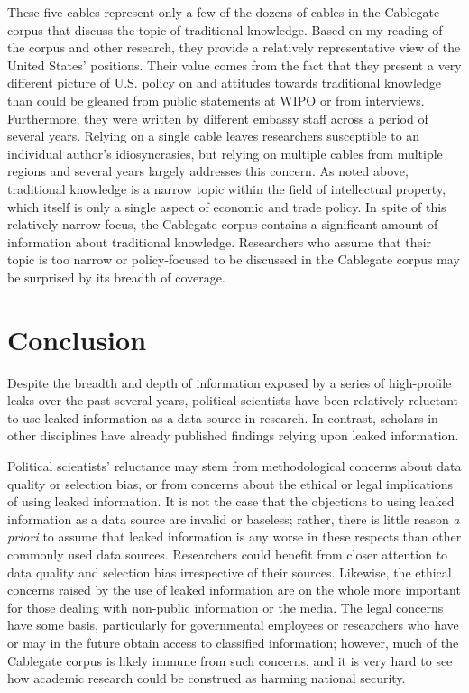 \documentclass[12pt]{article}
\begin{document}

These five cables represent only a few of the dozens of cables in the Cablegate corpus that discuss 
the topic of 
traditional knowledge. Based on my reading of the corpus and other research, they 
provide a relatively representative 
view of the United States' positions. Their value comes from the fact that they present a very different 
picture of U.S. policy 
on and attitudes towards traditional knowledge than could be gleaned from public statements at WIPO or 
from interviews. Furthermore, they were written by different embassy staff 
across a period of 
several years. Relying on a single cable leaves researchers susceptible to an 
individual author's idiosyncrasies, but relying on multiple cables from multiple regions and 
several years largely addresses this concern. As noted above, traditional knowledge is a narrow topic 
within the field of intellectual property, which itself is only a single aspect of economic and 
trade policy. In spite of this relatively narrow focus, the Cablegate corpus contains a significant 
amount of information about traditional knowledge. Researchers who assume that their topic is too 
narrow or policy-focused to be discussed in the Cablegate corpus may be surprised by its breadth of coverage.

\section{Conclusion}

Despite the breadth and depth of information exposed by a series of high-profile leaks over the past several years, 
political scientists have been relatively reluctant to use leaked information as a data source in research. 
In contrast, scholars in other disciplines have already published findings relying upon leaked information. 

Political scientists' reluctance may stem from methodological concerns about data quality or selection 
bias, or from concerns about the ethical or legal implications of using leaked information. 
It is not the case that the objections to using leaked information 
as a data source are invalid or baseless; rather, there is little reason \emph{a priori} to assume 
that leaked information is any worse in these respects than other commonly used data sources. 
Researchers could benefit from closer attention to data quality and 
selection bias irrespective of their sources.
Likewise, the ethical concerns raised by the use of leaked information are on the whole more important 
for those dealing with non-public information or the media. The legal concerns have some basis, 
particularly for governmental employees or researchers who have or may in the future obtain access to 
classified information; however, much of the Cablegate corpus is likely immune from such concerns, 
and it is very hard to see how academic research could be construed as harming national security.
\end{document}
